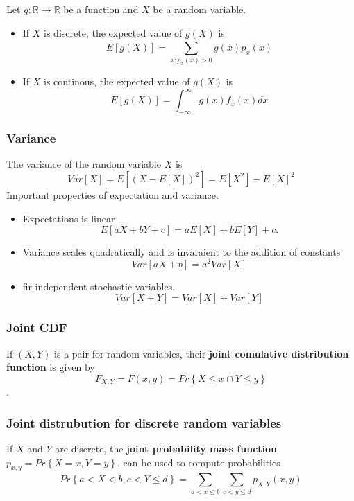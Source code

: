 \documentclass{article}
\theoremstyle{remark}
\begin{document}
Let $g: \mathbb{R}  \to \mathbb{R} $ be a function and $X$ be a random variable.
\begin{itemize}
  \item If $X$ is discrete, the expected value of $g\left( X \right) $ is \[
  E\left[ g\left( X \right) \right] =  \sum_{x: p_{x}\left( x \right)> 0}^{} g\left( x \right) p_{x}\left( x \right)
  \]
\item If $X$ is continous, the expected value of $g\left( X \right) $ is  \[
E\left[ g\left( X \right) \right] = \int_{-\infty}^{\infty} g\left( x \right)f_{x}\left( x \right) dx
\]
\end{itemize}

\subsubsection{Variance}%
\label{ssub:variance}

The variance of the random variable $X$ is \[
  Var\left[ X \right] =  E \left[( X - E\left[ X \right])^{2} \right] =  E\left[ X^2 \right] - E\left[ X \right]^2
\]
Important properties of expectation and variance.
\begin{itemize}
  \item Expectations is linear \[
  E\left[ aX + bY +c \right] = aE\left[ X \right] + bE\left[ Y \right] + c.
  \]
\item Variance scales quadratically and is invaraient to the addition of constants \[
Var\left[ aX + b \right] = a^2 Var \left[ X \right]
\]
\item fir independent stochastic variables.\[
    Var \left[ X + Y \right] = Var \left[ X \right] + Var\left[ Y \right]
\]
\end{itemize}

\subsubsection{Joint CDF}%
\label{ssub:joint_cdf}

If $\left( X,Y \right)$ is a pair for random variables, their \textbf{joint comulative distribution function } is given by \[
F_{X,Y} = F\left( x,y \right) =  Pr\left\{ X \le x \cap Y \le y \right\}
\].
\subsubsection{Joint distrubution for discrete random variables}%
\label{ssub:joint_distrobution_for_discrete_random_variables}
If $X$ and $Y$  are discrete, the \textbf{joint probability mass function } $ p_{x,y} = Pr\left\{ X = x, Y =y \right\} $. can be used to compute probabilities \[
Pr\left\{ a < X < b, c < Y \le d \right\} =  \sum_{a < x \le b}^{}  \sum_{c < y \le d}^{} p_{X,Y}   \left( x,y \right)
\]
\end{document}

